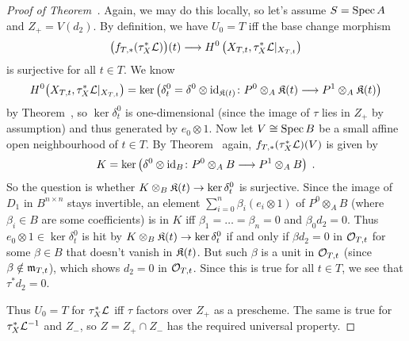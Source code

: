 \documentclass[a4paper,parskip=half,numbers=enddot, DIV=12]{scrreprt}
\begin{document}
\begin{proof}[Proof of Theorem~]
	Again, we may do this locally, so let's assume $S=\operatorname{Spec} A$ and $Z_+=V(d_2)$. By definition, we have $U_0=T$ iff the base change morphism
	\begin{align*}
		\big(f_{T,*}(\tau_X^*\Ll)\big)(t)\morphism H^0\left(X_{T,t},\tau_X^*\Ll|_{X_{T,t}}\right)
	\end{align*}
	is surjective for all $t\in T$. We know 
	\begin{align*}
		H^0\big(X_{T,t},\tau_X^*\Ll|_{X_{T,t}}\big)=\ker\left(\delta_t^0=\delta^0\otimes\id_{\KK(t)}\colon P^0\otimes_A\KK(t)\morphism P^1\otimes_A\KK(t)\right)
	\end{align*}
	by Theorem~, so $\ker \delta^0_t$ is one-dimensional (since the image of $\tau$ lies in $Z_+$ by assumption) and thus generated by $e_0\otimes1$. Now let $V\cong \operatorname{Spec} B$ be a small affine open neighbourhood of $t\in T$. By Theorem~ again, $f_{T,*}(\tau_X^*\mathcal{L})(V)$ is given by
	\begin{align*}
		K=\ker\left(\delta^0\otimes\id_B\colon P^0\otimes_AB\morphism P^1\otimes_AB\right)\;.
	\end{align*}
	So the question is whether $K\otimes_B\KK(t)\morphism \ker\delta_t^0$ is surjective. Since the image of $D_1$ in $B^{n\times n}$ stays invertible, an element $\sum_{i=0}^n\beta_i(e_i\otimes1)$ of $P^0\otimes_AB$ (where $\beta_i\in B$ are some coefficients) is in $K$ iff $\beta_1=\ldots=\beta_n=0$ and $\beta_0d_2=0$. Thus $e_0\otimes1\in\ker\delta_t^0$ is hit by $K\otimes_B\KK(t)\morphism \ker\delta_t^0$ if and only if $\beta d_2=0$ in $\mathcal{O}_{T,t}$ for some $\beta\in B$ that doesn't vanish in $\mathfrak{K}(t)$. But such $\beta$ is a unit in $\mathcal{O}_{T,t}$ (since $\beta\notin\mathfrak{m}_{T,t}$), which shows $d_2=0$ in $\mathcal{O}_{T,t}$. Since this is true for all $t\in T$, we see that $\tau^*d_2=0$.
	
	Thus $U_0=T$ for $\tau_X ^*\mathcal{L}$ iff $\tau$ factors over $Z_+$ as a prescheme. The same is true for $\tau_X^*\mathcal{L}^{-1}$ and $Z_-$, so $Z=Z_+\cap Z_-$ has the required universal property.
\end{proof}
\end{document}
